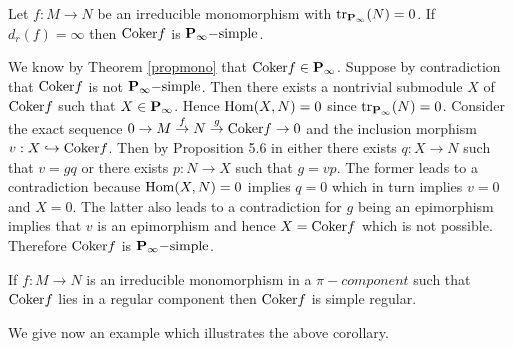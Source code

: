 \begin{thm}
\label{simpleregular}
Let $f:M \rightarrow N$ be an irreducible monomorphism with ${\rm tr}_{{\bf P_{\infty}}}(N)=0$. If $d_r(f)={\infty}$ then ${\rm Coker}f$ is ${\bf P_{\infty}-}{\rm simple}$.
\end{thm}

\begin{pf}
We know by Theorem \ref{propmono} that ${\rm Coker}f \in {\bf P_{\infty}}$. Suppose by contradiction that ${\rm Coker}f$ is not ${\bf P_{\infty}-}{\rm simple}$. Then there exists a nontrivial submodule $X$ of ${\rm Coker}f$ such that $X \in {\bf P_{\infty}}$. Hence ${\rm Hom}(X,N)=0$ since ${\rm tr}_{{\bf P_{\infty}}}(N)=0$. Consider the exact sequence $0 \rightarrow M \stackrel{f}{\rightarrow} N \stackrel{g}{\rightarrow} {\rm Coker}f \rightarrow 0$ and the inclusion morphism $v:X \hookrightarrow {\rm Coker}f$. Then by Proposition 5.6 in \cite{auslanderbook} either there exists $q:X \rightarrow N$ such that $v=gq$ or there exists $p:N \rightarrow X$ such that $g=vp$. The former leads to a contradiction because ${\rm Hom}(X,N)=0$ implies $q=0$ which in turn implies $v=0$ and $X=0$. The latter also leads to a contradiction for $g$ being an epimorphism implies that $v$ is an epimorphism and hence $X={\rm Coker}f$ which is not possible. Therefore ${\rm Coker}f$ is ${\bf P_{\infty}-}{\rm simple}$.

\end{pf}

\begin{cor}
\label{corregular}
If $f:M \rightarrow N$ is an irreducible monomorphism in a $\pi-component$ such that ${\rm Coker}f$ lies in a regular component then ${\rm Coker}f$ is simple regular.\\
\end{cor}

We give now an example which illustrates the above corollary.

